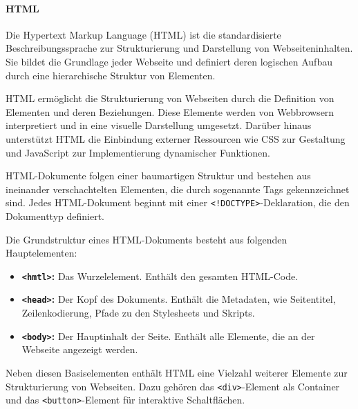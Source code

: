 \documentclass[12pt, letterpaper]{article}
\begin{document}
  \paragraph{HTML}
  \par \textbf{}
  \par Die Hypertext Markup Language (HTML) ist die standardisierte Beschreibungssprache zur Strukturierung und Darstellung von Webseiteninhalten. Sie bildet die Grundlage jeder Webseite und definiert deren logischen Aufbau durch eine hierarchische Struktur von Elementen. 
  \par HTML ermöglicht die Strukturierung von Webseiten durch die Definition von Elementen und deren Beziehungen. Diese Elemente werden von Webbrowsern interpretiert und in eine visuelle Darstellung umgesetzt. Darüber hinaus unterstützt HTML die Einbindung externer Ressourcen wie CSS zur Gestaltung und JavaScript zur Implementierung dynamischer Funktionen.
  \par HTML-Dokumente folgen einer baumartigen Struktur und bestehen aus ineinander verschachtelten Elementen, die durch sogenannte Tags gekennzeichnet sind. Jedes HTML-Dokument beginnt mit einer \texttt{<!DOCTYPE>}-Deklaration, die den Dokumenttyp definiert. 
  \par Die Grundstruktur eines HTML-Dokuments besteht aus folgenden Hauptelementen:
  \begin{itemize}
    \item \textbf{\texttt{<hmtl>}:} Das Wurzelelement. Enthält den gesamten HTML-Code.
    \item \textbf{\texttt{<head>}:} Der Kopf des Dokuments. Enthält die Metadaten, wie Seitentitel, Zeilenkodierung,  Pfade zu den Stylesheets und Skripts.
    \item \textbf{\texttt{<body>}:} Der Hauptinhalt der Seite. Enthält alle Elemente, die an der Webseite angezeigt werden.
  \end{itemize}
  \par Neben diesen Basiselementen enthält HTML eine Vielzahl weiterer Elemente zur Strukturierung von Webseiten. Dazu gehören das \texttt{<div>}-Element als Container und das \texttt{<button>}-Element für interaktive Schaltflächen.  
\end{document}
